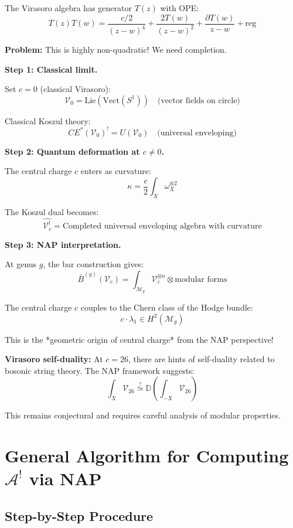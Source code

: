 \begin{example}\label{ex:virasoro-NAP}
The Virasoro algebra has generator $T(z)$ with OPE:
$$T(z) T(w) = \frac{c/2}{(z-w)^4} + \frac{2T(w)}{(z-w)^2} + \frac{\partial T(w)}{z-w} + \text{reg}$$

\textbf{Problem:} This is highly non-quadratic! We need completion.

\textbf{Step 1: Classical limit.}

Set $c = 0$ (classical Virasoro):
$$\mathcal{V}_0 = \text{Lie}(\text{Vect}(S^1)) \quad \text{(vector fields on circle)}$$

Classical Koszul theory:
$$CE^*(\mathcal{V}_0)^! = U(\mathcal{V}_0) \quad \text{(universal enveloping)}$$

\textbf{Step 2: Quantum deformation at $c \neq 0$.}

The central charge $c$ enters as curvature:
$$\kappa = \frac{c}{2} \int_X \omega_X^{\otimes 2}$$

The Koszul dual becomes:
$$\widehat{\mathcal{V}_c^!} = \text{Completed universal enveloping algebra with curvature}$$

\textbf{Step 3: NAP interpretation.}

At genus $g$, the bar construction gives:
$$\bar{B}^{(g)}(\mathcal{V}_c) = \int_{\mathcal{M}_g} \mathcal{V}_c^{\otimes n} \otimes \text{modular forms}$$

The central charge $c$ couples to the Chern class of the Hodge bundle:
$$c \cdot \lambda_1 \in H^2(\mathcal{M}_g)$$

This is the *geometric origin of central charge* from the NAP perspective!

\textbf{Virasoro self-duality:} At $c = 26$, there are hints of self-duality related to bosonic string theory. The NAP framework suggests:
$$\int_X \mathcal{V}_{26} \overset{?}{\simeq} \mathbb{D}\left(\int_{-X} \mathcal{V}_{26}\right)$$

This remains conjectural and requires careful analysis of modular properties.
\end{example}

\section{General Algorithm for Computing $\mathcal{A}^!$ via NAP}

\subsection{Step-by-Step Procedure}

